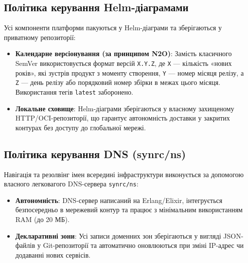 \subsection{Політика керування Helm-діаграмами}
Усі компоненти платформи пакуються у Helm-діаграми та зберігаються у приватному репозиторії:
\begin{itemize}
    \item \textbf{Календарне версіонування (за принципом N2O)}: Замість класичного SemVer використовується формат версій \texttt{X.Y.Z}, де \texttt{X} — кількість «нових років», які зустрів продукт з моменту створення, \texttt{Y} — номер місяця релізу, а \texttt{Z} — день релізу або порядковий номер збірки в межах цього місяця. Використання тегів \texttt{latest} заборонено.
    \item \textbf{Локальне сховище}: Helm-діаграми зберігаються у власному захищеному HTTP/OCI-репозиторії, що гарантує автономність доставки у закритих контурах без доступу до глобальної мережі.
\end{itemize}

\subsection{Політика керування DNS (synrc/ns)}
Навігація та резолвінг імен всередині інфраструктури виконується за допомогою власного легковагого DNS-сервера \texttt{synrc/ns}:
\begin{itemize}
    \item \textbf{Автономність}: DNS-сервер написаний на Erlang/Elixir, інтегрується безпосередньо в мережевий контур та працює з мінімальним використанням RAM (до 20 МБ).
    \item \textbf{Декларативні зони}: Усі записи доменних зон зберігаються у вигляді JSON-файлів у Git-репозиторії та автоматично оновлюються при зміні IP-адрес чи додаванні нових сервісів.
\end{itemize}

